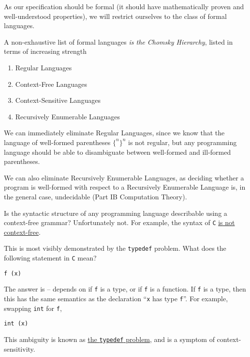 As our specification should be formal (it should have mathematically proven and well-understood properties), we will restrict ourselves to the class of formal languages. 

A non-exhaustive list of formal languages \textit{is the Chomsky Hierarchy}, listed in terms of increasing strength

\begin{enumerate}
    \item Regular Languages
    \item Context-Free Languages
    \item Context-Sensitive Languages
    \item Recursively Enumerable Languages
\end{enumerate}


We can immediately eliminate Regular Languages, since we know that the language of well-formed parentheses $\{^n \}^n$ is not regular, but any programming language should be able to disambiguate between well-formed and ill-formed parentheses. 

We can also eliminate Recursively Enumerable Languages, as deciding whether a program is well-formed with respect to a Recursively Enumerable Language is, in the general case, undecidable (\textsf{Part IB Computation Theory}). 

Is the syntactic structure of any programming language describable using a context-free grammar? Unfortunately not. For example, the syntax of \texttt{C} \href{https://eli.thegreenplace.net/2007/11/24/the-context-sensitivity-of-cs-grammar#:~:text=There%20is%20no%20way%20to,T%20and%20passed%20to%20func%20.}{is not context-free}.

This is most visibly demonstrated by the \texttt{typedef} problem. What does the following statement in \texttt{C} mean?
\begin{verbatim}
f (x)
\end{verbatim}
The answer is -- depends on if \texttt{f} is a type, or if \texttt{f} is a function. If \texttt{f} is a type, then this has the same semantics as the declaration ``\texttt{x} has type \texttt{f}''. For example, swapping \texttt{int} for \texttt{f},
\begin{verbatim}
int (x)
\end{verbatim}
This ambiguity is known as \href{https://www.gnu.org/software/bison/manual/bison.html#Semantic-Tokens}{the \texttt{typedef} problem}, and is a symptom of context-sensitivity.

